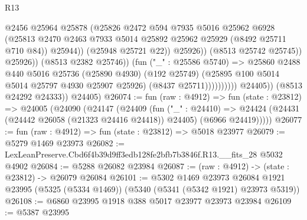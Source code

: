 \begin{lexlean}{R13}
\begin{coremodule}
                                            @2456
                                            @25964
                                            @25878
                                            (@25826
                                              @2472
                                              @594
                                              @7935
                                              @5016
                                              @25962
                                              @6928
                                              (@25813
                                                @2470
                                                @2463
                                                @7933
                                                @5014
                                                @25892
                                                @25962
                                                @25929
                                                (@8492 @25711 @710 @84))
                                              @25944))
                                          (@25948 @25721 @22))
                                        @25926))
                                    (@8513 @25742 @25745))
                                  @25926))
                              (@8513 @2382 @25746))
                            (fun ("_" : @25586 @5740) =>
                            @25860
                              @2488
                              @440
                              @5016
                              @25736
                              (@25890 @4930)
                              (@192 @25749)
                              (@25895 @100 @5014 @5014 @25797 @4930 @25907 @25926)
                              (@8437 @25711))))))))))
            @24405))
        (@8513 @24292 @24333))
      @24405)
@26074 := fun (raw : @4912) =>
  fun (state : @23812) =>
  @24005
    (@24090
      (@24147
        (@24409
          (fun ("_" : @24410) =>
          @24424 (@24431 (@24442 @26058 (@21323 @24416 @24418)) @24405) (@6966 @24419)))))
@26077 := fun (raw : @4912) => fun (state : @23812) => @5018 @23977
@26079 := @5279 @1469 @23973
@26082 := LexLeanPreserve.Cbd6f4b39d9ff3edb128fe2bfb7b3846f.R13.__fits_28 @5032 @4902
@26084 := @5288 @26082 @23984
@26087 := (raw : @4912) -> (state : @23812) -> @26079 @26084
@26101 := @5302
    @1469
    @23973
    @26084
    @1921
    @23995
    (@5325 (@5334 @1469))
    (@5340 (@5341 (@5342 @1921) @23973 @5319))
@26108 := @6860 @23995 @1918 @388 @5017 @23977 @23973 @23984
@26109 := @5387 @23995

\end{coremodule}
\end{lexlean}
